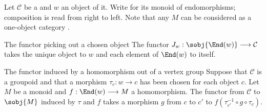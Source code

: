 Let $\mathcal C$ be a  and $w$ an
object of it.  Write  for its monoid
of endomorphisms; composition
 is read from right to
left.  Note that any  $M$ can be considered as a
one-object category .

\begin{definition}[id=2.1]{The functor picking out a chosen object}
The functor $J_w:\sobj{\End(w)}\longrightarrow\mathcal C$ takes the unique
object to $w$ and each element of $\End(w)$ to itself.
\end{definition}

\begin{definition}[id=2.2]{The functor induced by a homomorphism out of a vertex group}
Suppose that $\mathcal C$ is a groupoid and that a morphism
$\tau_c:w\longrightarrow c$ has been chosen for each object $c$.  Let $M$ be
a monoid and $f:\End(w)\longrightarrow M$ a homomorphism.
The functor from $\mathcal C$ to $\sobj{M}$ induced by $\tau$ and $f$
takes a morphism $g$ from $c$ to $c'$ to
$f(\tau_{c'}^{-1}\circ g\circ\tau_c)$.
\end{definition}
